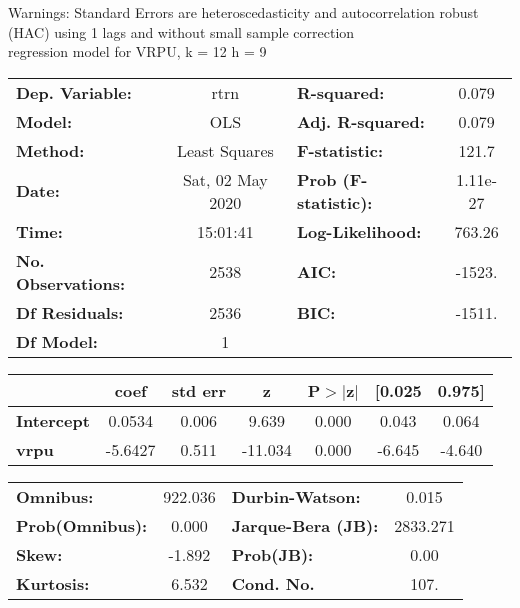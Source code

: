 Warnings: \newline
 [1] Standard Errors are heteroscedasticity and autocorrelation robust (HAC) using 1 lags and without small sample correction\\ 

regression model for VRPU, k = 12 h = 9\begin{center}
\begin{tabular}{lclc}
\toprule
\textbf{Dep. Variable:}    &       rtrn       & \textbf{  R-squared:         } &     0.079   \\
\textbf{Model:}            &       OLS        & \textbf{  Adj. R-squared:    } &     0.079   \\
\textbf{Method:}           &  Least Squares   & \textbf{  F-statistic:       } &     121.7   \\
\textbf{Date:}             & Sat, 02 May 2020 & \textbf{  Prob (F-statistic):} &  1.11e-27   \\
\textbf{Time:}             &     15:01:41     & \textbf{  Log-Likelihood:    } &    763.26   \\
\textbf{No. Observations:} &        2538      & \textbf{  AIC:               } &    -1523.   \\
\textbf{Df Residuals:}     &        2536      & \textbf{  BIC:               } &    -1511.   \\
\textbf{Df Model:}         &           1      & \textbf{                     } &             \\
\bottomrule
\end{tabular}
\begin{tabular}{lcccccc}
                   & \textbf{coef} & \textbf{std err} & \textbf{z} & \textbf{P$> |$z$|$} & \textbf{[0.025} & \textbf{0.975]}  \\
\midrule
\textbf{Intercept} &       0.0534  &        0.006     &     9.639  &         0.000        &        0.043    &        0.064     \\
\textbf{vrpu}      &      -5.6427  &        0.511     &   -11.034  &         0.000        &       -6.645    &       -4.640     \\
\bottomrule
\end{tabular}
\begin{tabular}{lclc}
\textbf{Omnibus:}       & 922.036 & \textbf{  Durbin-Watson:     } &    0.015  \\
\textbf{Prob(Omnibus):} &   0.000 & \textbf{  Jarque-Bera (JB):  } & 2833.271  \\
\textbf{Skew:}          &  -1.892 & \textbf{  Prob(JB):          } &     0.00  \\
\textbf{Kurtosis:}      &   6.532 & \textbf{  Cond. No.          } &     107.  \\
\bottomrule
\end{tabular}
\end{center}

